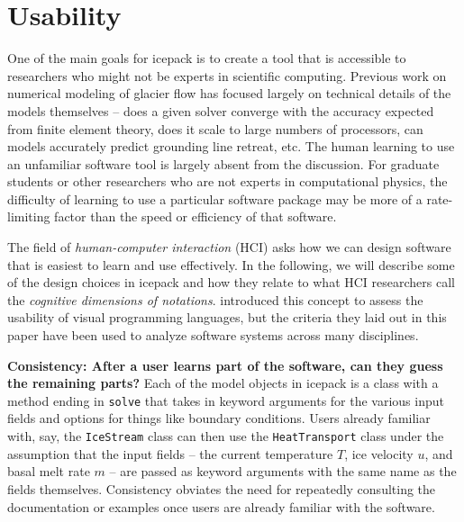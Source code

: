 \documentclass{article}
\theoremstyle{definition}
\theoremstyle{plain}
\begin{document}
\section{Usability}

One of the main goals for icepack is to create a tool that is accessible to researchers who might not be experts in scientific computing.
Previous work on numerical modeling of glacier flow has focused largely on technical details of the models themselves -- does a given solver converge with the accuracy expected from finite element theory, does it scale to large numbers of processors, can models accurately predict grounding line retreat, etc.
The human learning to use an unfamiliar software tool is largely absent from the discussion.
For graduate students or other researchers who are not experts in computational physics, the difficulty of learning to use a particular software package may be more of a rate-limiting factor than the speed or efficiency of that software.

The field of \emph{human-computer interaction} (HCI) asks how we can design software that is easiest to learn and use effectively.
In the following, we will describe some of the design choices in icepack and how they relate to what HCI researchers call the \emph{cognitive dimensions of notations}.
\citet{green1996usability} introduced this concept to assess the usability of visual programming languages, but the criteria they laid out in this paper have been used to analyze software systems across many disciplines.

\textbf{Consistency: After a user learns part of the software, can they guess the remaining parts?}
Each of the model objects in icepack is a class with a method ending in \texttt{solve} that takes in keyword arguments for the various input fields and options for things like boundary conditions.
Users already familiar with, say, the \texttt{IceStream} class can then use the \texttt{HeatTransport} class under the assumption that the input fields -- the current temperature $T$, ice velocity $u$, and basal melt rate $m$ -- are passed as keyword arguments with the same name as the fields themselves.
Consistency obviates the need for repeatedly consulting the documentation or examples once users are already familiar with the software.
\end{document}
